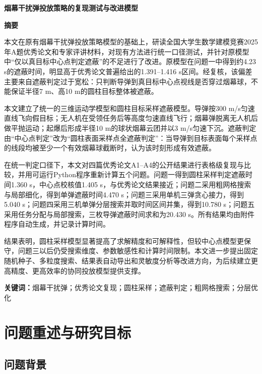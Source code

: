 \documentclass[12pt,a4paper]{article}
\begin{document}
\begin{center}
{\LARGE\bfseries 烟幕干扰弹投放策略的复现测试与改进模型}
\end{center}

\begin{center}
\textbf{\Large 摘要}
\end{center}

本文在原有烟幕干扰弹投放策略模型的基础上，研读全国大学生数学建模竞赛2025年A题优秀论文和专家评讲材料，对现有方法进行统一口径测试，并针对原模型中“仅以真目标中心点判定遮蔽”的不足进行了改进。原模型在问题一中得到约4.23 s的遮蔽时间，明显高于优秀论文普遍给出的1.391--1.416 s区间。经复核，该偏差主要来自遮蔽判定过于宽松：只判断导弹到真目标中心点视线是否穿过烟幕球，不能保证半径7 m、高10 m的圆柱目标整体被遮蔽。

本文建立了统一的三维运动学模型和圆柱目标采样遮蔽模型。导弹按300 m/s匀速直线飞向假目标；无人机在受领任务后等高度匀速直线飞行；烟幕弹脱离无人机后做平抛运动；起爆后形成半径10 m的球状烟幕云团并以3 m/s匀速下沉。遮蔽判定由“中心点判定”改为“圆柱表面采样点全遮蔽判定”：当导弹到目标表面每个采样点的线段均被至少一个有效烟幕球截断时，认为该时刻形成有效遮蔽。

在统一判定口径下，本文对四篇优秀论文A1--A4的公开结果进行表格级复现与比较，并用可运行Python程序重新计算五个问题。问题一得到圆柱采样判定遮蔽时间1.360 s，中心点校核值1.405 s，与优秀论文结果接近；问题二采用粗网格搜索与局部细化，得到单弹遮蔽时间4.470 s；问题三采用单机三弹贪心接力，得到5.040 s；问题四采用三机单弹分层搜索并取时间区间并集，得到10.780 s；问题五采用任务分配与局部搜索，三枚导弹遮蔽时间求和为20.430 s。所有结果均由附件程序自动生成，并记录计算时间。

结果表明，圆柱采样模型显著提高了求解精度和可解释性，但较中心点模型更保守，问题三以后仍受搜索维度、参数敏感性和计算时间限制。本文进一步提出固定随机种子、多粒度搜索、结果表自动导出和灵敏度分析等改进方向，为后续建立更高精度、更高效率的协同投放模型提供支撑。

\textbf{关键词：}烟幕干扰弹；优秀论文复现；圆柱采样；遮蔽判定；粗网格搜索；分层优化

\newpage

\section{问题重述与研究目标}

\subsection{问题背景}
\end{document}
